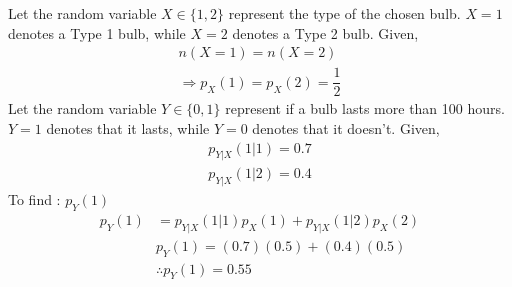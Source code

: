 
Let the random variable $X\in\{1,2\}$ represent the type of the chosen bulb. $X=1$ denotes a Type 1 bulb, while $X=2$ denotes a Type 2 bulb. Given,
\begin{align}
\tag{5.1}
    n(X=1)=n(X=2)\\
\tag{5.2}\Rightarrow p_{X}(1)=p_{X}(2)=\dfrac{1}{2}
\end{align}
Let the random variable $Y\in\{0,1\}$ represent if a bulb lasts more than 100 hours. $Y=1$ denotes that it lasts, while $Y=0$ denotes that it doesn't. Given, 
\begin{align}
\tag{5.3}
    p_{Y|X}(1|1)=0.7\\
\tag{5.4}
    p_{Y|X}(1|2)=0.4
\end{align}
To find : $p_{Y}(1)$
\begin{align}
\tag{5.5}
p_{Y}(1)&=p_{Y|X}(1|1)p_{X}(1)+p_{Y|X}(1|2)p_{X}(2)\\
\tag{5.6}
&p_{Y}(1)=(0.7)(0.5)+(0.4)(0.5)\\
\tag{5.7}
&\therefore p_{Y}(1)=0.55
\end{align}